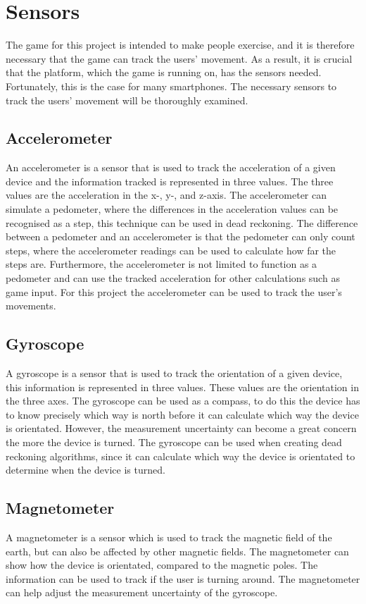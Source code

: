 \section{Sensors}\label{section:sensors}
The game for this project is intended to make people exercise, and it is therefore necessary that the game can track the users' movement.
As a result, it is crucial that the platform, which the game is running on, has the sensors needed.
Fortunately, this is the case for many smartphones.
The necessary sensors to track the users' movement will be thoroughly examined.

\subsection{Accelerometer}
An accelerometer is a sensor that is used to track the acceleration of a given device and the information tracked is represented in three values.
The three values are the acceleration in the x-, y-, and z-axis.
The accelerometer can simulate a pedometer, where the differences in the acceleration values can be recognised as a step, this technique can be used in dead reckoning.
The difference between a pedometer and an accelerometer is that the pedometer can only count steps, where the accelerometer readings can be used to calculate how far the steps are.
Furthermore, the accelerometer is not limited to function as a pedometer and can use the tracked acceleration for other calculations such as game input.
For this project the accelerometer can be used to track the user's movements. 

\subsection{Gyroscope}
A gyroscope is a sensor that is used to track the orientation of a given device, this information is represented in three values.
These values are the orientation in the three axes.
The gyroscope can be used as a compass, to do this the device has to know precisely which way is north before it can calculate which way the device is orientated.
However, the measurement uncertainty can become a great concern the more the device is turned.
The gyroscope can be used when creating dead reckoning algorithms, since it can calculate which way the device is orientated to determine when the device is turned.

\subsection{Magnetometer}
A magnetometer is a sensor which is used to track the magnetic field of the earth, but can also be affected by other magnetic fields.
The magnetometer can show how the device is orientated, compared to the magnetic poles.
The information can be used to track if the user is turning around.
The magnetometer can help adjust the measurement uncertainty of the gyroscope.